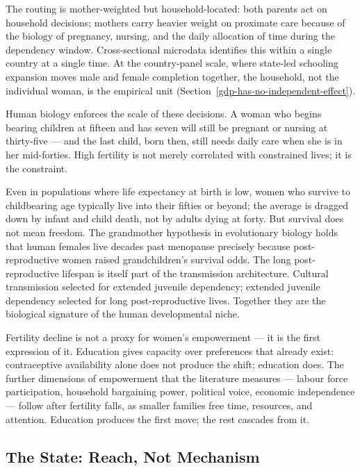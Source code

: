 \documentclass[12pt,letterpaper]{article}
\begin{document}
The routing is mother-weighted but household-located: both parents act
on household decisions; mothers carry heavier weight on proximate care
because of the biology of pregnancy, nursing, and the daily allocation
of time during the dependency window. Cross-sectional microdata
identifies this within a single country at a single time. At the
country-panel scale, where state-led schooling expansion moves male and
female completion together, the household, not the individual woman, is
the empirical unit (Section~\ref{gdp-has-no-independent-effect}).

Human biology enforces the scale of these decisions. A woman who begins
bearing children at fifteen and has seven will still be pregnant or
nursing at thirty-five --- and the last child, born then, still needs
daily care when she is in her mid-forties. High fertility is not merely
correlated with constrained lives; it is the constraint.

Even in populations where life expectancy at birth is low, women who
survive to childbearing age typically live into their fifties or beyond;
the average is dragged down by infant and child death, not by adults
dying at forty. But survival does not mean freedom. The grandmother
hypothesis in evolutionary biology holds that human females live decades
past menopause precisely because post-reproductive women raised
grandchildren's survival odds. The long post-reproductive lifespan is
itself part of the transmission architecture. Cultural transmission
selected for extended juvenile dependency; extended juvenile
dependency selected for long post-reproductive lives. Together
they are the biological signature of the human developmental niche.

Fertility decline is not a proxy for women's empowerment --- it is the
first expression of it. Education gives capacity over preferences that
already exist: contraceptive availability alone does not produce the
shift; education does. The further dimensions of empowerment that the
literature measures --- labour force participation, household
bargaining power, political voice, economic independence --- follow
after fertility falls, as smaller families free time, resources, and
attention. Education produces the first move; the rest cascades from it.

\subsection{The State: Reach, Not Mechanism}\label{the-state-reach-not-mechanism}
\end{document}
